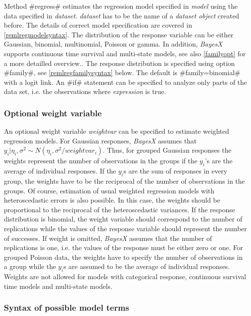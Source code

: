 Method #regress# estimates the regression model specified in {\em
model} using the data specified in {\em dataset}. {\em dataset}
has to be the name of a {\em dataset object} created before. The
details of correct model specification are covered in
\autoref{remlregmodelsyntax}. The distribution of the response
variable can be either Gaussian, binomial, multinomial, Poisson or
gamma. In addition, {\em BayesX} supports continuous time survival
and multi-state models, see also \autoref{familyopt} for a more
detailled overview.. The response distribution is specified using
option #family#, see \autoref{remlregfamilysyntax} below. The
default is #family=binomial# with a logit link. An #if# statement
can be specified to analyze only parts of the data set, i.e. the
observations where {\em expression} is true.

\subsubsection{Optional weight variable}
\label{remlregweightspecification}

An optional weight variable {\em weightvar} can be specified to
estimate weighted regression models. For Gaussian responses, {\em
BayesX} assumes that $y_i|\eta_i,\sigma^2 \sim
N(\eta_i,\sigma^2/weightvar_i)$. Thus, for grouped Gaussian
responses the weights represent the number of observations in the
groups if the $y_i$'s are the average of individual responses. If
the $y_i$s are the sum of responses in every group, the weights
have to be the reciprocal of the number of observations in the
groups. Of course, estimation of usual weighted regression models
with heteroscedastic errors is also possible. In this case, the
weights should be proportional to the reciprocal of the
heteroscedastic variances. If the response distribution is
binomial, the weight variable should correspond to the number of
replications while the values of the response variable should
represent the number of successes. If weight is omitted, {\em
BayesX} assumes that the number of replications is one, i.e. the
values of the response must be either zero or one. For grouped
Poisson data, the weights have to specify the number of
observations in a group while the $y_i$s are assumed to be the
average of individual responses. Weights are not allowed for
models with categorical response, continuous survival time models
and multi-state models.

\subsubsection{Syntax of possible model terms}
\label{remlregmodelsyntax}

